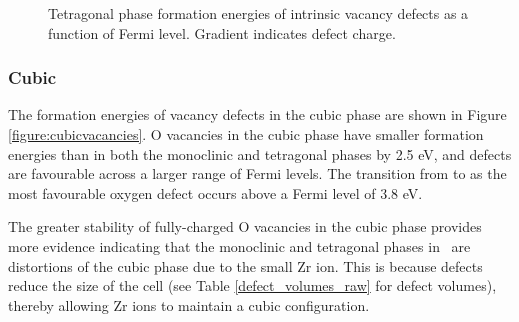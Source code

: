 \begin{figure}[ht] %
\begin{center}
		\caption{Tetragonal phase formation energies of intrinsic vacancy defects as a function of Fermi level. Gradient indicates defect charge.}
		\label{figure:tetvacancies}
	\end{center}
\end{figure}

\subsubsection{Cubic}

The formation energies of vacancy defects in the cubic phase are shown in Figure \ref{figure:cubicvacancies}. O vacancies in the cubic phase have smaller formation energies than in both the monoclinic and tetragonal phases by 2.5 eV, and  defects are favourable across a larger range of Fermi levels. The transition from  to  as the most favourable oxygen defect occurs above a Fermi level of 3.8 eV. 

The greater stability of fully-charged O vacancies in the cubic phase provides more evidence indicating that the monoclinic and tetragonal phases in \zirconia\ are distortions of the cubic phase due to the small Zr ion. This is because  defects reduce the size of the cell (see Table \ref{defect_volumes_raw} for defect volumes), thereby allowing Zr ions to maintain a cubic configuration.

